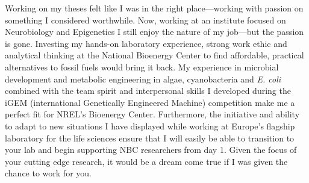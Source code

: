 \documentclass[11pt,a4paper,sans]{moderncv}
\date{\today}
\begin{document}
     
\makelettertitle
\begin{spacing}{1.15}
        
Working on my theses felt like I was in the right place---working with passion on something I considered worthwhile. 
Now, working at an institute focused on Neurobiology and Epigenetics I still enjoy the nature of my job---but the passion is gone. 
Investing my hands-on laboratory experience, strong work ethic and analytical thinking at the National Bioenergy Center to find affordable, practical alternatives to fossil fuels would bring it back.
My experience in microbial development and metabolic engineering in algae, cyanobacteria and \textit{E. coli} combined with the team spirit and interpersonal skills I developed during  the iGEM (international Genetically Engineered Machine) competition make me a perfect fit for NREL's Bioenergy Center. Furthermore, the initiative and ability to adapt to new situations I have displayed while working at Europe's flagship laboratory for the life sciences ensure that I will easily be able to transition to your lab and begin supporting NBC researchers from day 1.
Given the focus of your cutting edge research, it would be a dream come true if I was given the chance to work for you.
\par\vspace*{1mm}


\end{spacing}
\end{document}
